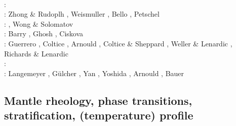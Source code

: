\begin{scriptsize}
                      \cite{fabc13}\cite{cosr13}
                      \cite{coml13}\cite{cost13}
                      \cite{stha13}
                      \cite{plth13}\cite{oflb13}\\
\twothousandfourteen: \cite{arfw14}\cite{helo14}\cite{crta14}\cite{flgw14}
                      \cite{roct14}\cite{cort14}\cite{becr14}
                      \cite{nata14}\cite{stha14}\cite{stlh14}\cite{ogaw14}\\
\twothousandfifteen: Zhong \& Rudoplh \cite{zhru15}, Weismuller \etal \cite{wegg15},
                     Bello \etal \cite{bect15}, Petschel \etal \cite{pesw15}\\
\twothousandsixteen: \cite{frbs16}\cite{sisc16}\cite{boba16}\cite{wele16}\cite{welm16}
                     \cite{vade16}\cite{chah16}, Wong \& Solomatov \cite{woso16b}\\
\twothousandseventeen: Barry \etal \cite{badw17}, Ghosh \etal \cite{ghts17}, 
                       Ciskova \etal \cite{civj17}\\
\twothousandeighteen: Guerrero \etal \cite{guld18}, Coltice \etal \cite{cold18}, 
                      Arnould \etal \cite{arcf18}, Coltice \& Sheppard \cite{cosh18}, 
                      Weller \& Lenardic \cite{wele18}, Richards \& Lenardic \cite{rile18}\\
\twothousandnineteen: \cite{gult19}\cite{mazh19}\cite{cohf19}\cite{lewh19}\cite{ulcw19}\cite{boba19}\cite{fube19}
      \cite{plju19}\\
\twothousandtwenty: Langemeyer \etal \cite{lalt20}, G\"ulcher \etal \cite{gugb20}, 
                    Yan \etal \cite{yabt20}, Yoshida \etal \cite{yosy20}, 
                    Arnould \etal \cite{arcf20}, Bauer \etal \cite{babd20}
\end{scriptsize}

\subsection{Mantle rheology, phase transitions, stratification, (temperature) profile}

